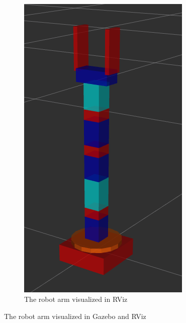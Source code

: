 \begin{figure}[htbp]
\begin{subfigure}[htbp]{0.45\textwidth}
    \end{subfigure}
    ~ 
    \begin{subfigure}[htbp]{0.45\textwidth}
        \centering
        \includegraphics[width = 1\linewidth, height = 0.705\textheight]{img/rvizRass.png}
        \caption{The robot arm visualized in RViz}
        \label{fig:robviz}
    \end{subfigure}
    \caption{The robot arm visualized in Gazebo and RViz}
    \label{fig:RG}
\end{figure}